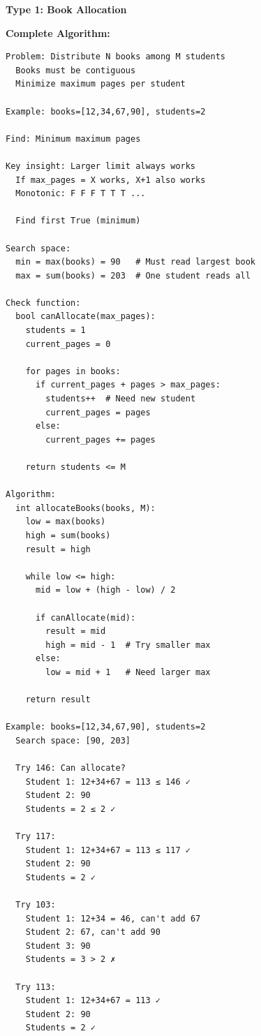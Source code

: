 \documentclass[11pt,a4paper,oneside]{book}
\begin{document}
\begin{tcolorbox}[
    enhanced,breakable,
    colback=successgreen!10,
    colframe=successgreen,
    boxrule=1.5pt,
    arc=3mm,
    title=\textbf{Complete Contiguous Allocation Algorithms}
]
\textbf{Type 1: Book Allocation}

\textbf{Complete Algorithm:}
\begin{verbatim}
Problem: Distribute N books among M students
  Books must be contiguous
  Minimize maximum pages per student
  
Example: books=[12,34,67,90], students=2
  
Find: Minimum maximum pages

Key insight: Larger limit always works
  If max_pages = X works, X+1 also works
  Monotonic: F F F T T T ...
  
  Find first True (minimum)

Search space:
  min = max(books) = 90   # Must read largest book
  max = sum(books) = 203  # One student reads all

Check function:
  bool canAllocate(max_pages):
    students = 1
    current_pages = 0
    
    for pages in books:
      if current_pages + pages > max_pages:
        students++  # Need new student
        current_pages = pages
      else:
        current_pages += pages
    
    return students <= M

Algorithm:
  int allocateBooks(books, M):
    low = max(books)
    high = sum(books)
    result = high
    
    while low <= high:
      mid = low + (high - low) / 2
      
      if canAllocate(mid):
        result = mid
        high = mid - 1  # Try smaller max
      else:
        low = mid + 1   # Need larger max
    
    return result

Example: books=[12,34,67,90], students=2
  Search space: [90, 203]
  
  Try 146: Can allocate?
    Student 1: 12+34+67 = 113 ≤ 146 ✓
    Student 2: 90
    Students = 2 ≤ 2 ✓
  
  Try 117:
    Student 1: 12+34+67 = 113 ≤ 117 ✓
    Student 2: 90
    Students = 2 ✓
  
  Try 103:
    Student 1: 12+34 = 46, can't add 67
    Student 2: 67, can't add 90
    Student 3: 90
    Students = 3 > 2 ✗
  
  Try 113:
    Student 1: 12+34+67 = 113 ✓
    Student 2: 90
    Students = 2 ✓
  

\end{verbatim}
\end{tcolorbox}
\end{document}
